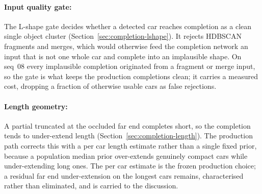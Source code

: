 \documentclass[a4paper,12pt]{report}
\begin{document}
\paragraph{Input quality gate:} The L-shape gate decides whether a detected car reaches
completion as a clean single object cluster (Section~\ref{sec:completion-lshape}). It
rejects HDBSCAN fragments and merges, which would otherwise feed the completion network an
input that is not one whole car and complete into an implausible shape. On seq~08 every
implausible completion originated from a fragment or merge input, so the gate is what keeps
the production completions clean; it carries a measured cost, dropping a fraction of
otherwise usable cars as false rejections.

\paragraph{Length geometry:} A partial truncated at the occluded far end completes short,
so the completion tends to under-extend length (Section~\ref{sec:completion-length}). The
production path corrects this with a per car length estimate rather than a single fixed
prior, because a population median prior over-extends genuinely compact cars while
under-extending long ones. The per car estimate is the frozen production choice; a residual
far end under-extension on the longest cars remains, characterised rather than eliminated,
and is carried to the discussion.
\end{document}
